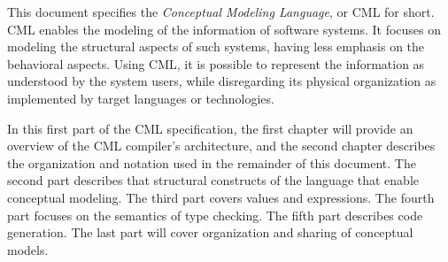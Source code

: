 This document specifies the \emph{Conceptual Modeling Language}, or CML for short.
CML enables the modeling of the information of software systems.
It focuses on modeling the structural aspects of such systems,
having less emphasis on the behavioral aspects.
Using CML,
it is possible to represent the information as understood by the system users,
while disregarding its physical organization as implemented by target languages or technologies.

In this first part of the CML specification,
the first chapter will provide an overview of the CML compiler's architecture,
and the second chapter describes the organization and notation
used in the remainder of this document.
The second part describes that structural constructs of the language
that enable conceptual modeling.
The third part covers values and expressions.
The fourth part focuses on the semantics of type checking.
The fifth part describes code generation.
The last part will cover organization and sharing of conceptual models.
